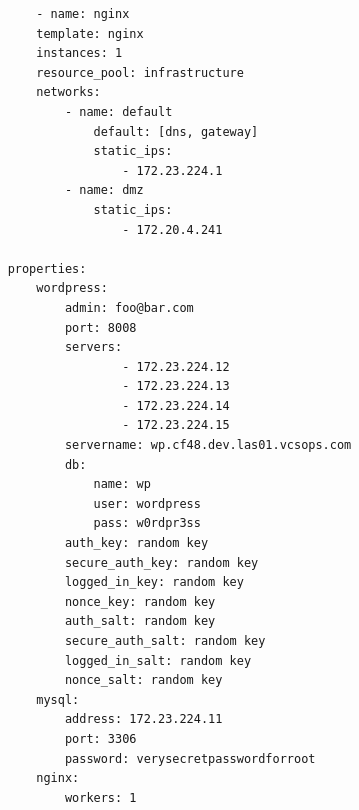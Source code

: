 \begin{adjustwidth}{2.5em}{2.5em}
\begin{verbatim}
        - name: nginx
        template: nginx
        instances: 1
        resource_pool: infrastructure
        networks:
            - name: default
                default: [dns, gateway]
                static_ips:
                    - 172.23.224.1
            - name: dmz
                static_ips:
                    - 172.20.4.241

    properties:
        wordpress:
            admin: foo@bar.com
            port: 8008
            servers:
                    - 172.23.224.12
                    - 172.23.224.13
                    - 172.23.224.14
                    - 172.23.224.15
            servername: wp.cf48.dev.las01.vcsops.com
            db:
                name: wp
                user: wordpress
                pass: w0rdpr3ss
            auth_key: random key
            secure_auth_key: random key
            logged_in_key: random key
            nonce_key: random key
            auth_salt: random key
            secure_auth_salt: random key
            logged_in_salt: random key
            nonce_salt: random key
        mysql:
            address: 172.23.224.11
            port: 3306
            password: verysecretpasswordforroot
        nginx:
            workers: 1

\end{verbatim}
\end{adjustwidth}





